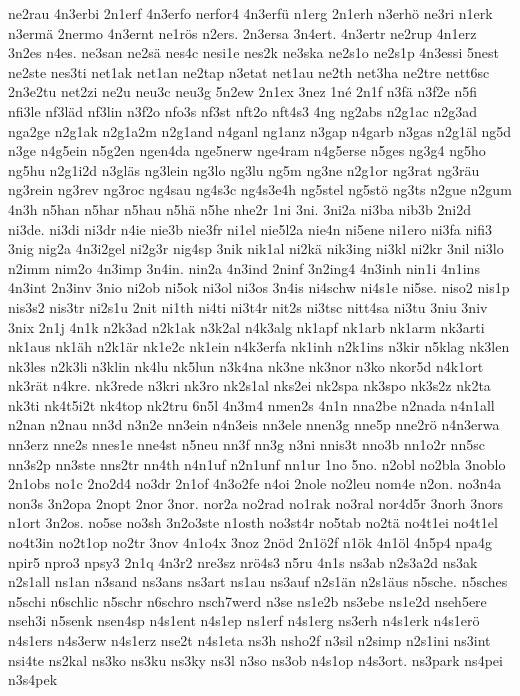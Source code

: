 {ne2rau
4n3erbi
2n1erf
4n3erfo
nerfor4
4n3erfü
n1erg
2n1erh
n3erhö
ne3ri
n1erk
n3ermä
2nermo
4n3ernt
ne1rös
n2ers.
2n3ersa
3n4ert.
4n3ertr
ne2rup
4n1erz
3n2es
n4es.
ne3san
ne2sä
nes4c
nesi1e
nes2k
ne3ska
ne2s1o
ne2s1p
4n3essi
5nest
ne2ste
nes3ti
net1ak
net1an
ne2tap
n3etat
net1au
ne2th
net3ha
ne2tre
nett6sc
2n3e2tu
net2zi
ne2u
neu3c
neu3g
5n2ew
2n1ex
3nez
1né
2n1f
n3fä
n3f2e
n5fi
nfi3le
nf3läd
nf3lin
n3f2o
nfo3s
nf3st
nft2o
nft4s3
4ng
ng2abs
n2g1ac
n2g3ad
nga2ge
n2g1ak
n2g1a2m
n2g1and
n4ganl
ng1anz
n3gap
n4garb
n3gas
n2g1äl
ng5d
n3ge
n4g5ein
n5g2en
ngen4da
nge5nerw
nge4ram
n4g5erse
n5ges
ng3g4
ng5ho
ng5hu
n2g1i2d
n3gläs
ng3lein
ng3lo
ng3lu
ng5m
ng3ne
n2g1or
ng3rat
ng3räu
ng3rein
ng3rev
ng3roc
ng4sau
ng4s3c
ng4s3e4h
ng5stel
ng5stö
ng3ts
n2gue
n2gum
4n3h
n5han
n5har
n5hau
n5hä
n5he
nhe2r
1ni
3ni.
3ni2a
ni3ba
nib3b
2ni2d
ni3de.
ni3di
ni3dr
n4ie
nie3b
nie3fr
ni1el
nie5l2a
nie4n
ni5ene
ni1ero
ni3fa
nifi3
3nig
nig2a
4n3i2gel
ni2g3r
nig4sp
3nik
nik1al
ni2kä
nik3ing
ni3kl
ni2kr
3nil
ni3lo
n2imm
nim2o
4n3imp
3n4in.
nin2a
4n3ind
2ninf
3n2ing4
4n3inh
nin1i
4n1ins
4n3int
2n3inv
3nio
ni2ob
ni5ok
ni3ol
ni3os
3n4is
ni4schw
ni4s1e
ni5se.
niso2
nis1p
nis3s2
nis3tr
ni2s1u
2nit
ni1th
ni4ti
ni3t4r
nit2s
ni3tsc
nitt4sa
ni3tu
3niu
3niv
3nix
2n1j
4n1k
n2k3ad
n2k1ak
n3k2al
n4k3alg
nk1apf
nk1arb
nk1arm
nk3arti
nk1aus
nk1äh
n2k1är
nk1e2c
nk1ein
n4k3erfa
nk1inh
n2k1ins
n3kir
n5klag
nk3len
nk3les
n2k3li
n3klin
nk4lu
nk5lun
n3k4na
nk3ne
nk3nor
n3ko
nkor5d
n4k1ort
nk3rät
n4kre.
nk3rede
n3kri
nk3ro
nk2s1al
nks2ei
nk2spa
nk3spo
nk3s2z
nk2ta
nk3ti
nk4t5i2t
nk4top
nk2tru
6n5l
4n3m4
nmen2s
4n1n
nna2be
n2nada
n4n1all
n2nan
n2nau
nn3d
n3n2e
nn3ein
n4n3eis
nn3ele
nnen3g
nne5p
nne2rö
n4n3erwa
nn3erz
nne2s
nnes1e
nne4st
n5neu
nn3f
nn3g
n3ni
nnis3t
nno3b
nn1o2r
nn5sc
nn3s2p
nn3ste
nns2tr
nn4th
n4n1uf
n2n1unf
nn1ur
1no
5no.
n2obl
no2bla
3noblo
2n1obs
no1c
2no2d4
no3dr
2n1of
4n3o2fe
n4oi
2nole
no2leu
nom4e
n2on.
no3n4a
non3s
3n2opa
2nopt
2nor
3nor.
nor2a
no2rad
no1rak
no3ral
nor4d5r
3norh
3nors
n1ort
3n2os.
no5se
no3sh
3n2o3ste
n1osth
no3st4r
no5tab
no2tä
no4t1ei
no4t1el
no4t3in
no2t1op
no2tr
3nov
4n1o4x
3noz
2nöd
2n1ö2f
n1ök
4n1öl
4n5p4
npa4g
npir5
npro3
npsy3
2n1q
4n3r2
nre3sz
nrö4s3
n5ru
4n1s
ns3ab
n2s3a2d
ns3ak
n2s1all
ns1an
n3sand
ns3ans
ns3art
ns1au
ns3auf
n2s1än
n2s1äus
n5sche.
n5sches
n5schi
n6schlic
n5schr
n6schro
nsch7werd
n3se
ns1e2b
ns3ebe
ns1e2d
nseh5ere
nseh3i
n5senk
nsen4sp
n4s1ent
n4s1ep
ns1erf
n4s1erg
ns3erh
n4s1erk
n4s1erö
n4s1ers
n4s3erw
n4s1erz
nse2t
n4s1eta
ns3h
nsho2f
n3sil
n2simp
n2s1ini
ns3int
nsi4te
ns2kal
ns3ko
ns3ku
ns3ky
ns3l
n3so
ns3ob
n4s1op
n4s3ort.
ns3park
ns4pei
n3s4pek
}
